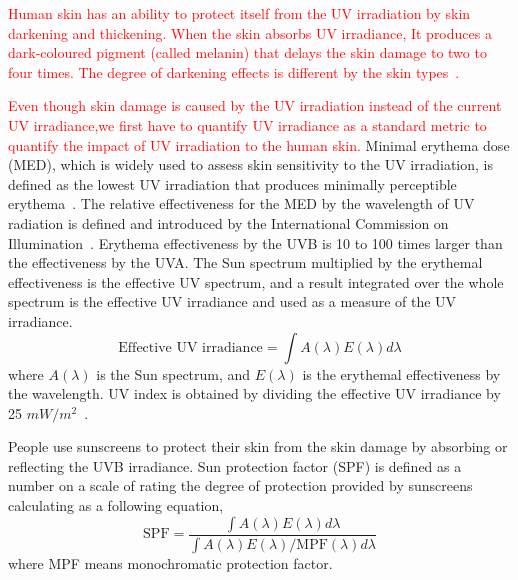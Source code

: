 \documentclass[journal]{IEEEtran}
\begin{document}
\textcolor{red}{Human skin has an ability to protect itself from the UV irradiation by skin darkening and thickening. When the skin absorbs UV irradiance, It produces a dark-coloured pigment (called melanin) that delays the skin damage to two to four times. The degree of darkening effects is different by the skin types~\cite{Harrison:Method02}.}


\textcolor{red}{Even though skin damage is caused by the UV irradiation instead of the current UV irradiance,we first have to quantify UV irradiance as  a standard metric to quantify the impact of UV irradiation to the human skin.}
Minimal erythema dose (MED), which is widely used to assess skin sensitivity to the UV irradiation, is defined as the lowest UV irradiation that produces minimally perceptible erythema~\cite{Diffey:CPPM91}. The relative effectiveness for the MED by the wavelength of UV radiation is defined and introduced by the International Commission on Illumination~\cite{CIE}. Erythema effectiveness by the UVB is 10 to 100 times larger than the effectiveness by the UVA. The Sun spectrum multiplied by the erythemal effectiveness is the effective UV spectrum, and a result integrated over the whole spectrum is the effective UV irradiance and used as a measure of the UV irradiance.
%
\begin{equation}
\text{Effective~UV~irradiance} = \int A(\lambda)E(\lambda) d \lambda
 \end{equation}
%
where $A(\lambda)$ is the Sun spectrum, and $E(\lambda)$ is the erythemal effectiveness by the wavelength. UV index is obtained by dividing the effective UV irradiance by 25 $mW/m^2$~\cite{CIE}.



People use sunscreens to protect their skin from the skin damage by absorbing or reflecting the UVB irradiance. Sun protection factor (SPF) is defined as a number on a scale of rating the degree of protection provided by sunscreens calculating as a following equation,
%
\begin{equation}
\text{SPF} = \frac{\int A(\lambda)E(\lambda) d \lambda}{\int A(\lambda)E(\lambda) / \text{MPF}(\lambda) d \lambda}
 \end{equation}
%
where MPF means monochromatic protection factor.
\end{document}
